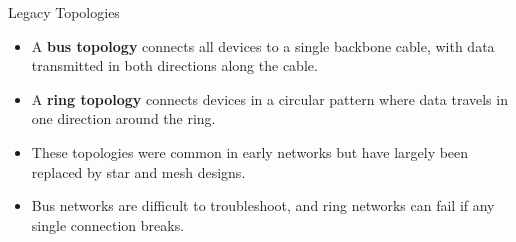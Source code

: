 \documentclass[aspectratio=169]{beamer}
\begin{document}
\begin{frame}{Legacy Topologies}

\begin{itemize}
    \item A \textbf{bus topology} connects all devices to a single backbone cable, with data transmitted in both directions along the cable.
    \item A \textbf{ring topology} connects devices in a circular pattern where data travels in one direction around the ring.
    \item These topologies were common in early networks but have largely been replaced by star and mesh designs.
    \item Bus networks are difficult to troubleshoot, and ring networks can fail if any single connection breaks.
\end{itemize}

\vspace{0.3cm}

\begin{center}
\end{center}

\end{frame}
\end{document}
